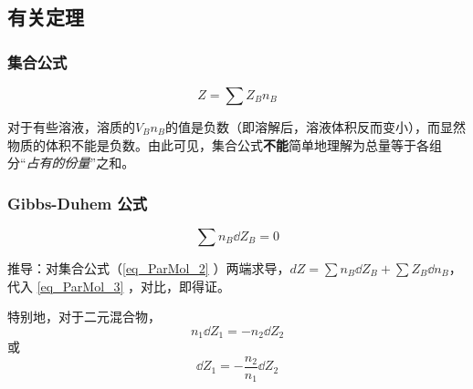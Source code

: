 \subsection{有关定理}
\subsubsection{集合公式}
\begin{equation}\label{eq_ParMol_2}
Z=\sum {Z_B}  n_B
\end{equation}

对于有些溶液，溶质的${V_B}n_B$的值是负数（即溶解后，溶液体积反而变小），而显然物质的体积不能是负数。由此可见，集合公式\textbf{不能}简单地理解为总量等于各组分“\textsl{占有的份量}”之和。

\subsubsection{Gibbs-Duhem 公式}
\begin{equation}
\sum n_B \dd Z_B = 0
\end{equation}

推导：对集合公式（\autoref{eq_ParMol_2} ）两端求导，$dZ=\sum n_B \dd Z_B + \sum {Z_B}  \dd n_B$，代入 \autoref{eq_ParMol_3} ，对比，即得证。

特别地，对于二元混合物，
\begin{equation}
n_1 \dd {Z_1} = - n_2 \dd {Z_2}
\end{equation}
或
\begin{equation}
\dd {Z_1} = -\frac{n_2}{n_1} \dd {Z_2}
\end{equation}

